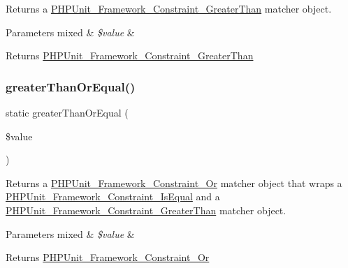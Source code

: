 Returns a \mbox{\hyperlink{class_p_h_p_unit___framework___constraint___greater_than}{P\+H\+P\+Unit\+\_\+\+Framework\+\_\+\+Constraint\+\_\+\+Greater\+Than}} matcher object.


\begin{DoxyParams}[1]{Parameters}
mixed & {\em \$value} & \\
\hline
\end{DoxyParams}
\begin{DoxyReturn}{Returns}
\mbox{\hyperlink{class_p_h_p_unit___framework___constraint___greater_than}{P\+H\+P\+Unit\+\_\+\+Framework\+\_\+\+Constraint\+\_\+\+Greater\+Than}} 
\end{DoxyReturn}
\mbox{\label{class_p_h_p_unit___framework___assert_ac3cdf050e416b37b461332a1102e68cd}} 
\subsubsection{\texorpdfstring{greater\+Than\+Or\+Equal()}{greaterThanOrEqual()}}
{\footnotesize\ttfamily static greater\+Than\+Or\+Equal (\begin{DoxyParamCaption}\item[{}]{\$value }\end{DoxyParamCaption})\hspace{0.3cm}{\ttfamily [static]}}

Returns a \mbox{\hyperlink{class_p_h_p_unit___framework___constraint___or}{P\+H\+P\+Unit\+\_\+\+Framework\+\_\+\+Constraint\+\_\+\+Or}} matcher object that wraps a \mbox{\hyperlink{class_p_h_p_unit___framework___constraint___is_equal}{P\+H\+P\+Unit\+\_\+\+Framework\+\_\+\+Constraint\+\_\+\+Is\+Equal}} and a \mbox{\hyperlink{class_p_h_p_unit___framework___constraint___greater_than}{P\+H\+P\+Unit\+\_\+\+Framework\+\_\+\+Constraint\+\_\+\+Greater\+Than}} matcher object.


\begin{DoxyParams}[1]{Parameters}
mixed & {\em \$value} & \\
\hline
\end{DoxyParams}
\begin{DoxyReturn}{Returns}
\mbox{\hyperlink{class_p_h_p_unit___framework___constraint___or}{P\+H\+P\+Unit\+\_\+\+Framework\+\_\+\+Constraint\+\_\+\+Or}} 
\end{DoxyReturn}
\mbox{\label{class_p_h_p_unit___framework___assert_afa94881322dc417140524efbb8e7590e}} 
